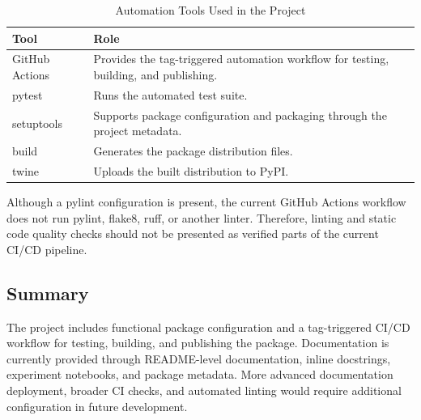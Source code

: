 \begin{table}[H]
      \centering
      \caption{Automation Tools Used in the Project}
      \label{tab:automation_tools}
      \renewcommand{\arraystretch}{1.2}
      \begin{tabularx}{\textwidth}{
                  >{\raggedright\arraybackslash}p{3.2cm}
                  >{\raggedright\arraybackslash}X
            }
            \toprule
            \textbf{Tool}  & \textbf{Role}                                                        \\
            \midrule
            GitHub Actions &
            Provides the tag-triggered automation workflow for testing, building, and publishing. \\

            pytest         &
            Runs the automated test suite.                                                        \\

            setuptools     &
            Supports package configuration and packaging through the project metadata.            \\

            build          &
            Generates the package distribution files.                                             \\

            twine          &
            Uploads the built distribution to PyPI.                                               \\
            \bottomrule
      \end{tabularx}
\end{table}

Although a pylint configuration is present, the current GitHub Actions workflow does not run pylint, flake8, ruff, or another linter. Therefore, linting and static code quality checks should not be presented as verified parts of the current CI/CD pipeline.

\subsection{Summary}

\hs The project includes functional package configuration and a tag-triggered CI/CD workflow for testing, building, and publishing the package. Documentation is currently provided through README-level documentation, inline docstrings, experiment notebooks, and package metadata. More advanced documentation deployment, broader CI checks, and automated linting would require additional configuration in future development.

